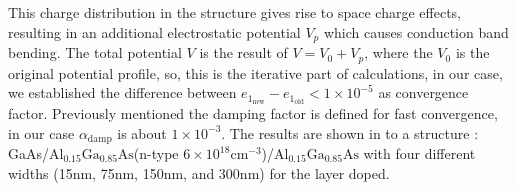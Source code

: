This charge distribution in the structure gives rise to space charge effects, resulting in an additional electrostatic potential $V_{p}$ which causes conduction band bending\cite{jirauschek2014modeling,jovanovic2005mechanisms}. The total potential $V$ is the result of $V=V_{0}+V_{p}$, where the $V_{0}$ is the original potential profile, so, this is the iterative part of calculations, in our case, we established the difference between $e_{{1}_{\mathrm{new}}}\! -\! e_{{1}_{\mathrm{old}}}\! <\! 1\times10^{-5}$ as convergence factor. Previously mentioned the damping factor is defined for fast convergence, in our case $\alpha_{\mathrm{damp}}$ is about $1\times 10^{-3}$. The results are shown in  to a structure :  GaAs/$\mathrm{Al_{0.15}Ga_{0.85}As}$(n-type $6\times 10^{18} \mathrm{cm}^{-3}$)/$\mathrm{Al_{0.15}Ga_{0.85}As}$ with four different widths (15nm, 75nm, 150nm, and 300nm) for the  layer doped. 


